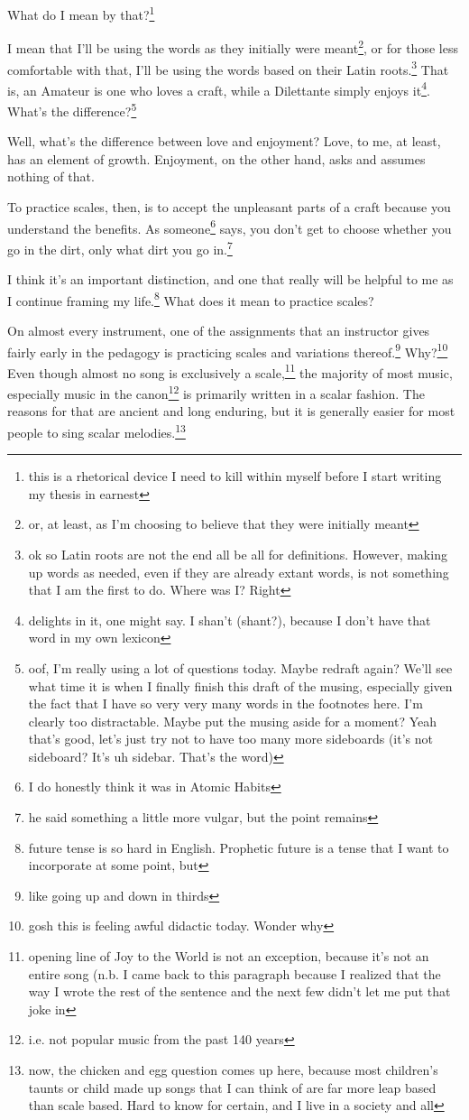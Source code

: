 \documentclass[12pt]{article}[titlepage]
\newcommand{\1}{\={a}}
\newcommand{\2}{\={e}}
\newcommand{\3}{\={\i}}
\newcommand{\4}{\=o}
\newcommand{\5}{\=u}
\newcommand{\6}{\={A}}
\renewcommand{\,}{\textsuperscript{,}}
\begin{document}
What do I mean by that?\footnote{this is a rhetorical device I need to kill within myself before I start writing my thesis in earnest}

I mean that I'll be using the words as they initially were meant\footnote{or, at least, as I'm choosing to believe that they were initially meant}, or for those less comfortable with that, I'll be using the words based on their Latin roots.\footnote{ok so Latin roots are not the end all be all for definitions. However, making up words as needed, even if they are already extant words, is not something that I am the first to do. Where was I? Right}
That is, an Amateur is one who loves a craft, while a Dilettante simply enjoys it\footnote{delights in it, one might say. I shan't (shant?), because I don't have that word in my own lexicon}.
What's the difference?\footnote{oof, I'm really using a lot of questions today. Maybe redraft again? We'll see what time it is when I finally finish this draft of the musing, especially given the fact that I have so very very many words in the footnotes here. I'm clearly too distractable. Maybe put the musing aside for a moment? Yeah that's good, let's just try not to have too many more sideboards (it's not sideboard? It's uh sidebar. That's the word)}

Well, what's the difference between love and enjoyment?
Love, to me, at least, has an element of growth.
Enjoyment, on the other hand, asks and assumes nothing of that.

To practice scales, then, is to accept the unpleasant parts of a craft because you understand the benefits.
As someone\footnote{I do honestly think it was in Atomic Habits} says, you don't get to choose whether you go in the dirt, only what dirt you go in.\footnote{he said something a little more vulgar, but the point remains}

I think it's an important distinction, and one that really will be helpful to me as I continue framing my life.\footnote{future tense is so hard in English. Prophetic future is a tense that I want to incorporate at some point, but}
What does it mean to practice scales?

On almost every instrument, one of the assignments that an instructor gives fairly early in the pedagogy is practicing scales and variations thereof.\footnote{like going up and down in thirds}
Why?\footnote{gosh this is feeling awful didactic today. Wonder why}
Even though almost no song is exclusively a scale,\footnote{opening line of Joy to the World is not an exception, because it's not an entire song (n.b. I came back to this paragraph because I realized that the way I wrote the rest of the sentence and the next few didn't let me put that joke in} the majority of most music, especially music in the canon\footnote{i.e. not popular music from the past 140 years} is primarily written in a scalar fashion.
The reasons for that are ancient and long enduring, but it is generally easier for most people to sing scalar melodies.\footnote{now, the chicken and egg question comes up here, because most children's taunts or child made up songs that I can think of are far more leap based than scale based. Hard to know for certain, and I live in a society and all}
\end{document}
